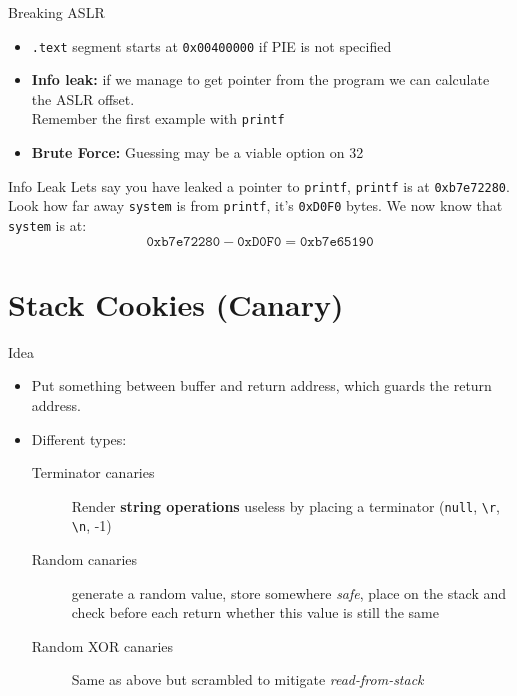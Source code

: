 \documentclass[beamer]{uibk}
\begin{document}
\begin{frame}{Breaking ASLR}
    \begin{itemize}
        \item \texttt{.text} segment starts at \texttt{0x00400000} if PIE is
            not specified
        \medskip
        \pause
        \item \textbf{Info leak:} if we manage to get pointer from the program
            we can calculate the ASLR offset.\\
            Remember the first example with \texttt{printf}
        \medskip
    \item \textbf{Brute Force:} Guessing may be a viable option on
        \SI{32}{\bit}
    \end{itemize}
\end{frame}

\begin{frame}{Info Leak}
    Lets say you have leaked a pointer to \texttt{printf}, \texttt{printf} is
    at  \texttt{0xb7e72280}.
    \bigskip
    Look how far away \texttt{system} is from \texttt{printf}, it's
    \texttt{0xD0F0} bytes.
    \bigskip
    We now know that \texttt{system} is at:
    \[ \mathtt{0xb7e72280} - \mathtt{0xD0F0} = \mathtt{0xb7e65190} \]
\end{frame}

\section{Stack Cookies (Canary)}

\begin{frame}{Idea}
    \begin{itemize}
        \item Put something between buffer and return address, which guards the
            return address.
        \bigskip
        \pause
        \item Different types:
        \begin{description}
            \item[Terminator canaries] Render \textbf{string operations}
                useless by placing a terminator (\texttt{null},
                \texttt{\textbackslash r}, \texttt{\textbackslash n}, -1)
            \medskip
            \item [Random canaries] generate a random value, store somewhere
                \textit{safe}, place on the stack and check before each return
                whether this value is still the same
            \medskip
            \item [Random XOR canaries] Same as above but scrambled to mitigate
                \textit{read-from-stack}
        \end{description}
    \end{itemize}
\end{frame}
\end{document}
